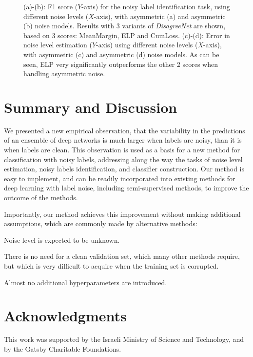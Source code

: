\documentclass{article}
\begin{document}
\begin{figure}[htbp]
\begin{subfigure}[b]{0.245\textwidth}
    \end{subfigure}
     \caption[Estimation]{(a)-(b): F1 score ($Y$-axis) for the noisy label identification task, using different noise levels ($X$-axis), with asymmetric (a) and asymmetric (b) noise models. Results with 3 variants of \emph{DisagreeNet} are shown, based on 3 scores: MeanMargin, ELP and CumLoss. (c)-(d): Error in noise level estimation ($Y$-axis) using different noise levels ($X$-axis), with asymmetric (c) and asymmetric (d) noise models. As can be seen, ELP very significantly outperforms the other 2 scores when handling asymmetric noise. } 
     \label{fig:score-comparisons-no-ext}
     \vspace{-1.0em}
\end{figure}



\section{Summary and Discussion}

We presented a new empirical observation, that the variability in the predictions of an ensemble of deep networks is much larger when labels are noisy, than it is when labels are clean. This observation is used as a basis for a new method for classification with noisy labels, addressing along the way the tasks of noise level estimation, noisy labels identification, and classifier construction. Our method is easy to implement, and can be readily incorporated into existing methods for deep learning with label noise, including semi-supervised methods, to improve the outcome of the methods.

Importantly, our method achieves this improvement without making additional assumptions, which are commonly made by alternative methods: \begin{inparaenum}[(i)] \item Noise level is expected to be unknown. \item There is no need for a clean validation set, which many other methods require, but which is very difficult to acquire when the training set is corrupted. \item Almost no additional hyperparameters are introduced. \end{inparaenum}




\section*{Acknowledgments}
This work was supported by the Israeli Ministry of Science and Technology, and by the Gatsby Charitable Foundations. 
\end{document}
